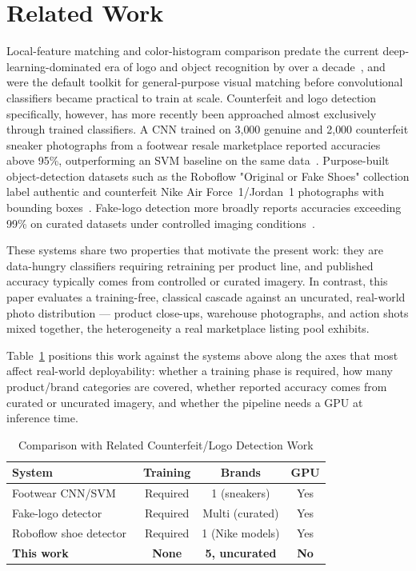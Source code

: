 \documentclass[conference]{IEEEtran}
\begin{document}
\section{Related Work}
\label{sec:related}

Local-feature matching and color-histogram comparison predate the
current deep-learning-dominated era of logo and object recognition by
over a decade~\cite{lowe2004,opencv}, and were the default toolkit for
general-purpose visual matching before convolutional classifiers became
practical to train at scale. Counterfeit and logo detection specifically,
however, has more recently been approached almost exclusively through
trained classifiers. A CNN trained on 3{,}000 genuine and 2{,}000
counterfeit sneaker photographs from a footwear resale marketplace
reported accuracies above 95\%, outperforming an SVM baseline on the
same data~\cite{footwear2024}. Purpose-built object-detection datasets
such as the Roboflow "Original or Fake Shoes" collection label authentic
and counterfeit Nike Air Force~1/Jordan~1 photographs with bounding
boxes~\cite{roboflow2024}. Fake-logo detection more broadly reports
accuracies exceeding 99\% on curated datasets under controlled imaging
conditions~\cite{fakelogo2024}.

These systems share two properties that motivate the present work: they
are data-hungry classifiers requiring retraining per product line, and
published accuracy typically comes from controlled or curated imagery.
In contrast, this paper evaluates a training-free, classical cascade
against an uncurated, real-world photo distribution --- product
close-ups, warehouse photographs, and action shots mixed together, the
heterogeneity a real marketplace listing pool exhibits.

Table~\ref{tab:related} positions this work against the systems above
along the axes that most affect real-world deployability: whether a
training phase is required, how many product/brand categories are
covered, whether reported accuracy comes from curated or uncurated
imagery, and whether the pipeline needs a GPU at inference time.

\begin{table}[t]
\caption{Comparison with Related Counterfeit/Logo Detection Work}
\label{tab:related}
\centering
\begin{tabular}{lccc}
\toprule
System & Training & Brands & GPU \\
\midrule
Footwear CNN/SVM~\cite{footwear2024} & Required & 1 (sneakers) & Yes \\
Fake-logo detector~\cite{fakelogo2024} & Required & Multi (curated) & Yes \\
Roboflow shoe detector~\cite{roboflow2024} & Required & 1 (Nike models) & Yes \\
\textbf{This work} & \textbf{None} & \textbf{5, uncurated} & \textbf{No} \\
\bottomrule
\end{tabular}
\end{table}
\end{document}
